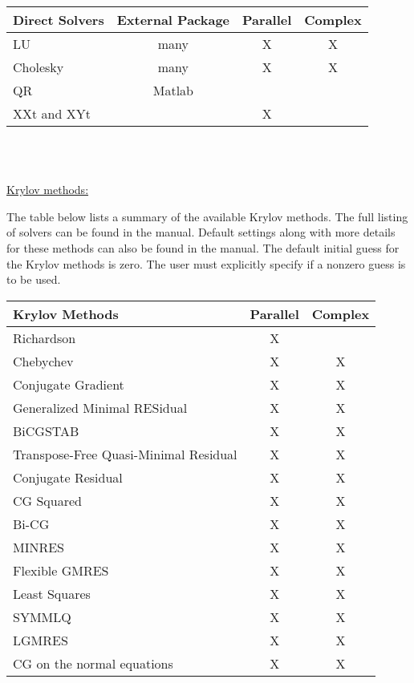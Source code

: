 \documentclass[12pt,twoside]{article}
\begin{document}
\begin{tabular}{|l|c|c|c|}
\hline
\textbf{Direct Solvers} & \textbf{External Package} & \textbf{Parallel} & \textbf{Complex} \\
\hline
LU & many & X & X \\
\hline
Cholesky & many & X & X \\
\hline
QR & Matlab &  &  \\
\hline
XXt and XYt &   & X &   \\
\hline
\end{tabular} \\ 
\\
\begin{flushleft}
\underline{Krylov methods:}
\end{flushleft}

The table below lists a summary of the available Krylov methods. The full listing of solvers can be found in the manual. Default settings along with more details for these methods can also be found in the manual. The default initial guess for the Krylov methods is zero. The user must explicitly specify if a nonzero guess is to be used.
\\

\begin{tabular}{|l|c|c|}
\hline
\textbf{Krylov Methods} & \textbf{Parallel} & \textbf{Complex} \\
\hline
Richardson & X &   \\
\hline
Chebychev & X & X \\
\hline
Conjugate Gradient & X & X \\
\hline
Generalized Minimal RESidual & X & X \\
\hline
BiCGSTAB & X & X \\
\hline
Transpose-Free Quasi-Minimal Residual & X & X \\
\hline
Conjugate Residual & X & X \\
\hline
CG Squared & X & X \\
\hline
Bi-CG & X & X \\
\hline
MINRES & X & X \\
\hline
Flexible GMRES & X & X \\
\hline
Least Squares & X & X \\
\hline
SYMMLQ & X & X \\
\hline
LGMRES & X & X \\
\hline
CG on the normal equations & X & X \\
\hline
\end{tabular} \\
\\
\end{document}
